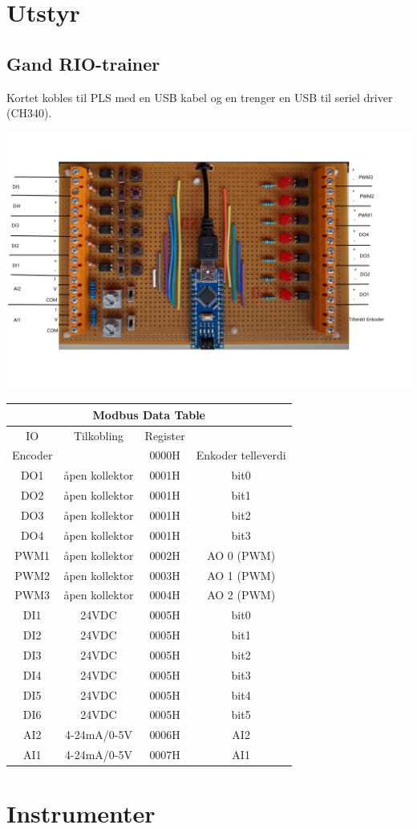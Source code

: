 
\section{Utstyr}
\subsection{Gand RIO-trainer}

Kortet kobles til PLS med en USB kabel og en trenger en USB til seriel
driver (CH340). 

\includegraphics[width=1\textwidth]{./GandRioTrainer.jpg}
\small
\begin{tabular}{|c|c|c|c|}
\hline 
\multicolumn{4}{|c|}{Modbus Data Table}\tabularnewline
\hline 
\hline 
IO & Tilkobling & Register & \tabularnewline
\hline 
Encoder &  & 0000H & Enkoder telleverdi\tabularnewline
\hline 
DO1 & åpen kollektor & 0001H & bit0\tabularnewline
\hline 
DO2 & åpen kollektor & 0001H & bit1\tabularnewline
\hline 
DO3 & åpen kollektor & 0001H & bit2\tabularnewline
\hline 
DO4 & åpen kollektor & 0001H & bit3\tabularnewline
\hline 
PWM1 & åpen kollektor & 0002H & AO 0 (PWM)\tabularnewline
\hline 
PWM2 & åpen kollektor & 0003H & AO 1 (PWM)\tabularnewline
\hline 
PWM3 & åpen kollektor & 0004H & AO 2 (PWM)\tabularnewline
\hline 
DI1 & 24VDC & 0005H & bit0\tabularnewline
\hline 
DI2 & 24VDC & 0005H & bit1\tabularnewline
\hline 
DI3 & 24VDC & 0005H & bit2\tabularnewline
\hline 
DI4 & 24VDC & 0005H & bit3\tabularnewline
\hline 
DI5 & 24VDC & 0005H & bit4\tabularnewline
\hline 
DI6 & 24VDC & 0005H & bit5\tabularnewline
\hline 
AI2 & 4-24mA/0-5V & 0006H & AI2\tabularnewline
\hline 
AI1 & 4-24mA/0-5V & 0007H & AI1\tabularnewline
\hline 
\end{tabular}
\normalsize
\vfil \eject
\section{Instrumenter}
